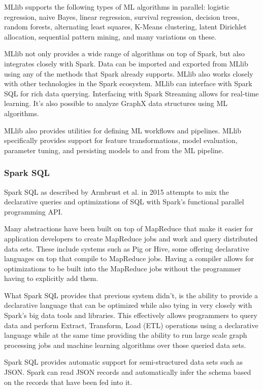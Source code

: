 \documentclass[]{article}
\begin{document}
MLlib supports the following types of ML algorithms in parallel: logistic regression, naive Bayes, linear regression, survival regression, decision trees, random forests, alternating least squares, K-Means clustering, latent Dirichlet allocation, sequential pattern mining, and many variations on these.

MLlib not only provides a wide range of algorithms on top of Spark, but also integrates closely with Spark. Data can be imported and exported from MLlib using any of the methods that Spark already supports. MLlib also works closely with other technologies in the Spark ecosystem. MLlib can interface with Spark SQL for rich data querying. Interfacing with Spark Streaming allows for real-time learning. It's also possible to analyze GraphX data structures using ML algorithms.

MLlib also provides utilities for defining ML workflows and pipelines. MLlib specifically provides support for feature transformations, model evaluation, parameter tuning, and persisting models to and from the ML pipeline.

\subsubsection{Spark SQL}
Spark SQL as described by Armbrust et al.\cite{armbrust2015spark} in 2015 attempts to mix the declarative queries and optimizations of SQL with Spark's functional parallel programming API.

Many abstractions have been built on top of MapReduce that make it easier for application developers to create MapReduce jobs and work and query distributed data sets. These include systems such as Pig or Hive, some offering declarative languages on top that compile to MapReduce jobs. Having a compiler allows for optimizations to be built into the MapReduce jobs without the programmer having to explicitly add them.

What Spark SQL provides that previous system didn't, is the ability to provide a declarative language that can be optimized while also tying in very closely with Spark's big data tools and libraries. This effectively allows programmers to query data and perform Extract, Transform, Load (ETL) operations using a declarative language while at the same time providing the ability to run large scale graph processing jobs and machine learning algorithms over those queried data sets. 

Spark SQL provides automatic support for semi-structured data sets such as JSON. Spark can read JSON records and automatically infer the schema based on the records that have been fed into it.
\end{document}
